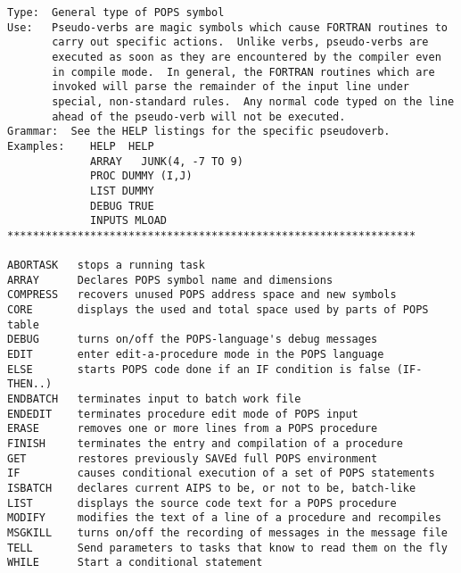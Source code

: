 {}

\vskip 0.5pt
\bbve\begin{verbatim}
Type:  General type of POPS symbol
Use:   Pseudo-verbs are magic symbols which cause FORTRAN routines to
       carry out specific actions.  Unlike verbs, pseudo-verbs are
       executed as soon as they are encountered by the compiler even
       in compile mode.  In general, the FORTRAN routines which are
       invoked will parse the remainder of the input line under
       special, non-standard rules.  Any normal code typed on the line
       ahead of the pseudo-verb will not be executed.
Grammar:  See the HELP listings for the specific pseudoverb.
Examples:    HELP  HELP
             ARRAY   JUNK(4, -7 TO 9)
             PROC DUMMY (I,J)
             LIST DUMMY
             DEBUG TRUE
             INPUTS MLOAD
****************************************************************

ABORTASK   stops a running task
ARRAY      Declares POPS symbol name and dimensions
COMPRESS   recovers unused POPS address space and new symbols
CORE       displays the used and total space used by parts of POPS table
DEBUG      turns on/off the POPS-language's debug messages
EDIT       enter edit-a-procedure mode in the POPS language
ELSE       starts POPS code done if an IF condition is false (IF-THEN..)
ENDBATCH   terminates input to batch work file
ENDEDIT    terminates procedure edit mode of POPS input
ERASE      removes one or more lines from a POPS procedure
FINISH     terminates the entry and compilation of a procedure
GET        restores previously SAVEd full POPS environment
IF         causes conditional execution of a set of POPS statements
ISBATCH    declares current AIPS to be, or not to be, batch-like
LIST       displays the source code text for a POPS procedure
MODIFY     modifies the text of a line of a procedure and recompiles
MSGKILL    turns on/off the recording of messages in the message file
TELL       Send parameters to tasks that know to read them on the fly
WHILE      Start a conditional statement
\end{verbatim}\eve


